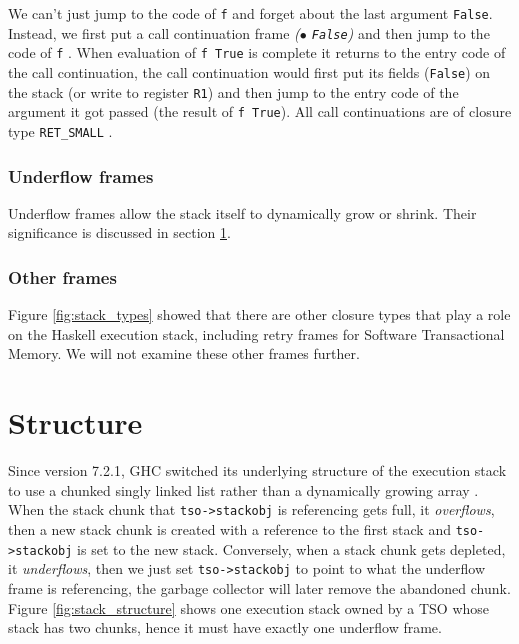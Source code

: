 We can't just jump to the code of \texttt{f} and forget about the last
argument \texttt{False}. Instead, we first put a call continuation
frame \emph{($\bullet$ \texttt{False})} and then jump to the code of \texttt{f}
\cite{evalapplyjfp06}.
When evaluation of \texttt{f True} is complete it returns to
the entry code of the call continuation, the call continuation would
first put its fields (\texttt{False}) on the stack (or write to
register \texttt{R1}) and then jump to the entry code of the argument it
got passed (the result of \texttt{f True}).
All call continuations are of closure type \texttt{RET\_SMALL}
\cite{github_genapply_RET_SMALL}.

\subsubsection{Underflow frames}

Underflow frames allow the stack itself to dynamically grow or
shrink. Their significance is discussed in section \ref{sec:structure_of_stack}.

\subsubsection{Other frames}

Figure \ref{fig:stack_types} showed that there are other closure types
that play a role on the Haskell execution stack, including retry frames
for Software Transactional Memory. We will not examine these other
frames further.

\section{Structure} \label{sec:structure_of_stack}

Since version 7.2.1, GHC switched its underlying structure of the
execution stack to use a chunked singly linked list rather than a
dynamically growing array
\cite{ghc_blog_overhaul_of_stack_management, ghc_changeset_stack_chunks}. When the stack chunk that
\texttt{tso->stackobj} is referencing gets full, it \emph{overflows},
then a new stack chunk is created with a reference to the first stack
and \texttt{tso->stackobj} is set to the new stack. Conversely, when
a stack chunk gets depleted, it \emph{underflows}, then we just
set \texttt{tso->stackobj} to point to what the underflow frame is
referencing, the garbage collector will later remove the abandoned
chunk. Figure \ref{fig:stack_structure} shows one execution stack
owned by a TSO whose stack has two chunks, hence it must have exactly
one underflow frame.

